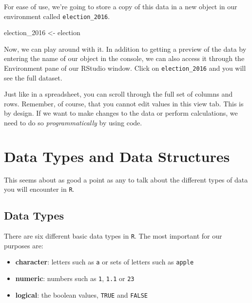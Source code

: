 \documentclass[
  letterpaper,
]{book}
\newenvironment{Shaded}{\begin{snugshade}}{\end{snugshade}}
\newcommand{\NormalTok}[1]{\textcolor[rgb]{0.00,0.23,0.31}{#1}}
\newcommand{\OtherTok}[1]{\textcolor[rgb]{0.00,0.23,0.31}{#1}}
\providecommand{\tightlist}{%
  \setlength{\itemsep}{0pt}\setlength{\parskip}{0pt}}\usepackage{longtable,booktabs,array}
\begin{document}
For ease of use, we're going to store a copy of this data in a new
object in our environment called \texttt{election\_2016}.

\begin{Shaded}
\begin{Highlighting}[]
\NormalTok{election\_2016 }\OtherTok{\textless{}{-}}\NormalTok{ election}
\end{Highlighting}
\end{Shaded}

Now, we can play around with it. In addition to getting a preview of the
data by entering the name of our object in the console, we can also
access it through the Environment pane of our RStudio window. Click on
\texttt{election\_2016} and you will see the full dataset.

Just like in a spreadsheet, you can scroll through the full set of
columns and rows. Remember, of course, that you cannot edit values in
this view tab. This is by design. If we want to make changes to the data
or perform calculations, we need to do so \emph{programmatically} by
using code.

\hypertarget{data-types-and-data-structures}{%
\section{Data Types and Data
Structures}\label{data-types-and-data-structures}}

This seems about as good a point as any to talk about the different
types of data you will encounter in \texttt{R}.

\hypertarget{data-types}{%
\subsection{Data Types}\label{data-types}}

There are six different basic data types in \texttt{R}. The most
important for our purposes are:

\begin{itemize}
\tightlist
\item
  \textbf{character}: letters such as
  \texttt{\textquotesingle{}a\textquotesingle{}} or sets of letters such
  as \texttt{\textquotesingle{}apple\textquotesingle{}}
\item
  \textbf{numeric}: numbers such as \texttt{1}, \texttt{1.1} or
  \texttt{23}
\item
  \textbf{logical}: the boolean values, \texttt{TRUE} and \texttt{FALSE}
\end{itemize}
\end{document}

